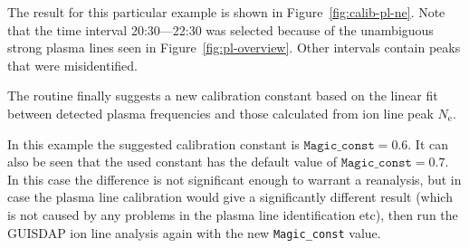 \documentclass[a4]{article}
\begin{document}
The result for this particular example is shown in
Figure~\ref{fig:calib-pl-ne}. Note that the time interval
20:30---22:30 was selected because of the unambiguous strong plasma
lines seen in Figure~\ref{fig:pl-overview}. Other intervals contain
peaks that were misidentified.

The routine finally suggests a new calibration constant based on the
linear fit between detected plasma frequencies and those calculated
from ion line peak $N_\mathrm{e}$.

In this example the suggested calibration constant is
$\mathtt{Magic\_const}=0.6$. It can also be seen that the used
constant has the default value of $\mathtt{Magic\_const}=0.7$. In this
case the difference is not significant enough to warrant a reanalysis, but in case the plasma line calibration would give a significantly different result (which is not caused by any problems in the plasma line identification etc), then run the GUISDAP ion line analysis again with the new \texttt{Magic\_const} value.
\end{document}
